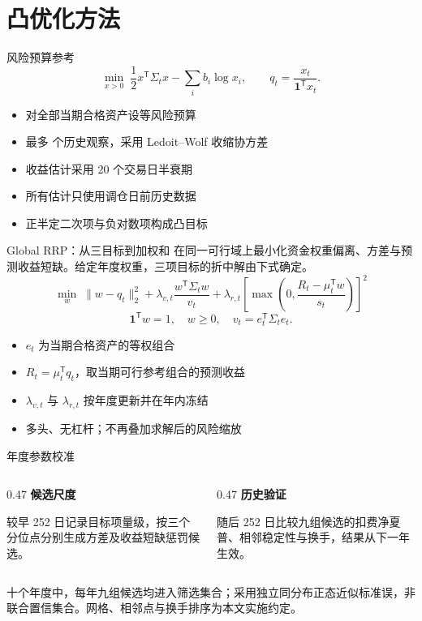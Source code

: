 \documentclass[aspectratio=169,11pt]{beamer}
\begin{document}
\section{凸优化方法}
\begin{frame}{风险预算参考}
\[
\min_{x>0}\;\frac12x^\mathsf{T}\Sigma_t x-\sum_i b_i\log x_i,
\qquad q_t=\frac{x_t}{\mathbf1^\mathsf{T}x_t}.
\]
\begin{itemize}
\item 对全部当期合格资产设等风险预算
\item 最多 \lookbackDays{} 个历史观察，采用 Ledoit--Wolf 收缩协方差
\item 收益估计采用 20 个交易日半衰期
\item 所有估计只使用调仓日前历史数据
\item 正半定二次项与负对数项构成凸目标
\end{itemize}
\end{frame}
\begin{frame}{Global RRP：从三目标到加权和}
在同一可行域上最小化资金权重偏离、方差与预测收益短缺。给定年度权重，三项目标的折中解由下式确定。
\[
\min_w\;\|w-q_t\|_2^2+\lambda_{v,t}\frac{w^\mathsf{T}\Sigma_t w}{v_t}
+\lambda_{r,t}\left[\max\left(0,\frac{R_t-\mu_t^\mathsf{T}w}{s_t}\right)\right]^2
\]
\[
\mathbf1^\mathsf{T}w=1,\quad w\geq0,\quad v_t=e_t^\mathsf{T}\Sigma_t e_t.
\]
\begin{itemize}
\item $e_t$ 为当期合格资产的等权组合
\item $R_t=\mu_t^\mathsf{T}q_t$，取当期可行参考组合的预测收益
\item $\lambda_{v,t}$ 与 $\lambda_{r,t}$ 按年度更新并在年内冻结
\item 多头、无杠杆；不再叠加求解后的风险缩放
\end{itemize}
\end{frame}
\begin{frame}{年度参数校准}
\begin{columns}[T]
\begin{column}{0.47\textwidth}
\textcolor{holdingBlue}{\textbf{候选尺度}}
\par\medskip
较早 252 日记录目标项量级，按三个分位点分别生成方差及收益短缺惩罚候选。
\end{column}
\begin{column}{0.47\textwidth}
\textcolor{holdingRed}{\textbf{历史验证}}
\par\medskip
随后 252 日比较九组候选的扣费净夏普、相邻稳定性与换手，结果从下一年生效。
\end{column}
\end{columns}
\par\medskip
\small 十个年度中，每年九组候选均进入筛选集合；采用独立同分布正态近似标准误，非联合置信集合。网格、相邻点与换手排序为本文实施约定。
\end{frame}
\end{document}
